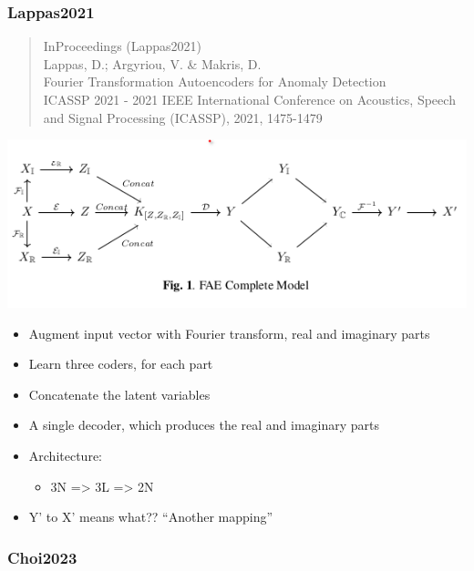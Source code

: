 \documentclass[
  letterpaper,
  DIV=11,
  numbers=noendperiod]{scrartcl}
\providecommand{\tightlist}{%
  \setlength{\itemsep}{0pt}\setlength{\parskip}{0pt}}\usepackage{longtable,booktabs,array}
\begin{document}
\hypertarget{lappas2021}{%
\subsubsection{Lappas2021}\label{lappas2021}}

\begin{quote}
InProceedings (Lappas2021)\\
Lappas, D.; Argyriou, V. \& Makris, D.\\
Fourier Transformation Autoencoders for Anomaly Detection\\
ICASSP 2021 - 2021 IEEE International Conference on Acoustics, Speech
and Signal Processing (ICASSP), 2021, 1475-1479
\end{quote}

\includegraphics{img/2023-02-27-10-00-46.png}

\begin{itemize}
\tightlist
\item
  Augment input vector with Fourier transform, real and imaginary parts
\item
  Learn three coders, for each part
\item
  Concatenate the latent variables
\item
  A single decoder, which produces the real and imaginary parts
\item
  Architecture:

  \begin{itemize}
  \tightlist
  \item
    3N =\textgreater{} 3L =\textgreater{} 2N
  \end{itemize}
\item
  Y' to X' means what?? ``Another mapping''
\end{itemize}

\hypertarget{choi2023}{%
\subsubsection{Choi2023}\label{choi2023}}
\end{document}
